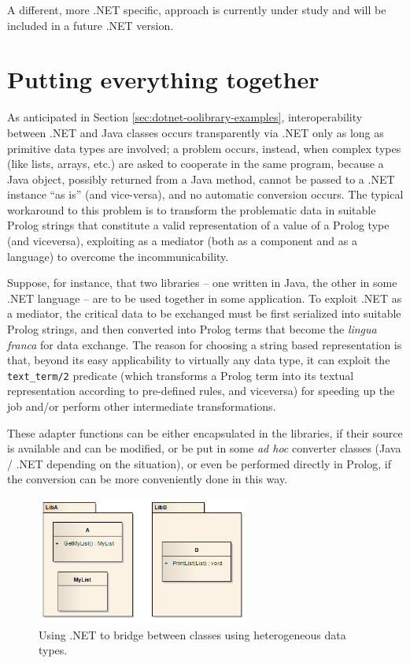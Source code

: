 \noindent A different, more .NET specific, approach is currently under study and will be included in a future \tuprolog{}.NET version.

\section{Putting everything together}
\label{sec:dotnet-putting-together}

As anticipated in Section \ref{sec:dotnet-oolibrary-examples}, interoperability between .NET and Java classes occurs transparently via \tuprolog{}.NET only as long as primitive data types are involved; a problem occurs, instead, when complex types (like lists, arrays, etc.) are asked to cooperate in the same \tuprolog{} program, because a Java object, possibly returned from a Java method, cannot be passed to a .NET instance ``as is'' (and vice-versa), and no automatic conversion occurs.
The typical workaround to this problem is to transform the problematic data in suitable Prolog strings that constitute a valid \tuprolog{} representation of a value of a Prolog type (and viceversa), exploiting \tuprolog{} as a mediator (both as a component and as a language) to overcome the incommunicability.

Suppose, for instance, that two libraries -- one written in Java, the other in some .NET language -- are to be used together in some application.
To exploit \tuprolog{}.NET as a mediator, the critical data to be exchanged must be first serialized into suitable Prolog strings, and then converted into Prolog terms that become the \textit{lingua franca} for data exchange.
The reason for choosing a string based representation is that, beyond its easy applicability to virtually any data type, it can exploit the \texttt{text\_term/2} predicate (which transforms a Prolog term into its textual representation according to pre-defined rules, and viceversa) for speeding up the job and/or perform other intermediate transformations.

These adapter functions can be either encapsulated in the libraries, if their source is available and can be modified, or be put in some \textit{ad hoc} converter classes (Java / .NET depending on the situation), or even be performed directly in Prolog, if the conversion can be more conveniently done in this way.

\begin{figure}
   \centering
  \includegraphics[width=7cm]{images/dotnet-pipolo1}
  \caption{Using \tuprolog{}.NET to bridge between classes using heterogeneous data types.}\label{fig:dotnet-pipolo1}
\end{figure}

